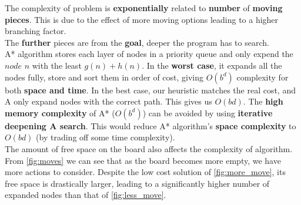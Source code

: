 \documentclass[10.5pt,a4paper]{article}
\begin{document}
        The complexity of problem is \textbf{exponentially} related to \textbf{number} of \textbf{moving pieces}. This is due to the effect of more moving options leading to a higher branching factor.\\
        The \textbf{further} pieces are from the \textbf{goal}, deeper the program has to search.\\
        A* algorithm stores each layer of nodes in a priority queue and only expend the $node$ $n$ with the least $g(n)+h(n)$. In the \textbf{worst case}, it expands all the nodes fully, store and sort them in order of cost, giving $O(b^d)$ complexity for both \textbf{space and time}. In the best case, our heuristic matches the real cost, and A only expand nodes with the correct path. This gives us $O(bd)$. The \textbf{high memory complexity} of A* ($O(b^d)$) can be avoided by using \textbf{iterative deepening A search}. This would reduce A* algorithm's \textbf{space complexity} to $O(bd)$ (by trading off some time complexity).\\
        The amount of free space on the board also affects the complexity of algorithm. From \ref{fig:moves} we can see that as the board becomes more empty, we have more actions to consider. Despite the low cost solution of \ref{fig:more_move}, its free space is drastically larger, leading to a significantly higher number of expanded nodes than that of \ref{fig:less_move}.
\end{document}
